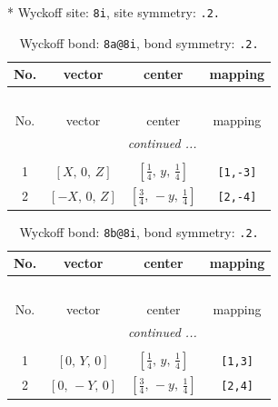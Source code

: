\documentclass[fleqn,8pt]{jsarticle}
\begin{document}
* Wyckoff site: {\tt 8i}, site symmetry: {\tt .2.}
\renewcommand{\arraystretch}{1.2}
\begin{longtable}{cccc}
\caption{Wyckoff bond: {\tt 8a@8i}, bond symmetry: {\tt .2.}}
 \\
 \hline \hline
No. & vector & center & mapping \\ \hline \endfirsthead

\multicolumn{3}{l}{\tablename\ \thetable{}} \\
 \hline \hline
No. & vector & center & mapping \\ \hline \endhead

 \hline \hline
\multicolumn{3}{r}{\footnotesize\it continued ...} \\ \endfoot

 \hline \hline
\multicolumn{3}{r}{} \\ \endlastfoot

1 & $\left[ X,\, 0,\, Z \right]$ & $\left[ \frac{1}{4},\, y,\, \frac{1}{4} \right]$ & {\tt [1,-3]} \\ \hline
2 & $\left[ - X,\, 0,\, Z \right]$ & $\left[ \frac{3}{4},\, - y,\, \frac{1}{4} \right]$ & {\tt [2,-4]} \\
\end{longtable}
\renewcommand{\arraystretch}{1.2}
\begin{longtable}{cccc}
\caption{Wyckoff bond: {\tt 8b@8i}, bond symmetry: {\tt .2.}}
 \\
 \hline \hline
No. & vector & center & mapping \\ \hline \endfirsthead

\multicolumn{3}{l}{\tablename\ \thetable{}} \\
 \hline \hline
No. & vector & center & mapping \\ \hline \endhead

 \hline \hline
\multicolumn{3}{r}{\footnotesize\it continued ...} \\ \endfoot

 \hline \hline
\multicolumn{3}{r}{} \\ \endlastfoot

1 & $\left[ 0,\, Y,\, 0 \right]$ & $\left[ \frac{1}{4},\, y,\, \frac{1}{4} \right]$ & {\tt [1,3]} \\ \hline
2 & $\left[ 0,\, - Y,\, 0 \right]$ & $\left[ \frac{3}{4},\, - y,\, \frac{1}{4} \right]$ & {\tt [2,4]} \\
\end{longtable}
\renewcommand{\arraystretch}{1.2}
\end{document}
